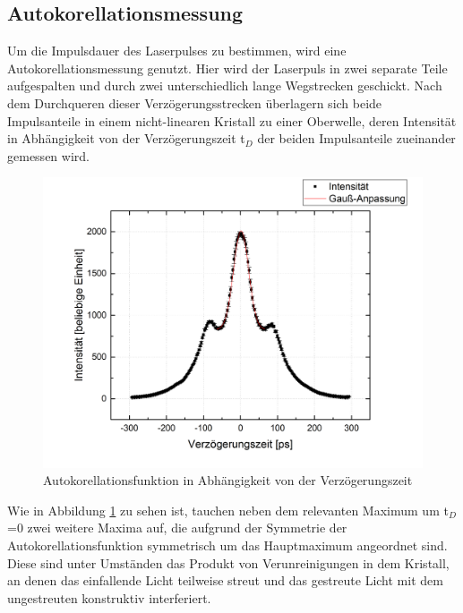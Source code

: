 \subsection{Autokorellationsmessung}
Um die Impulsdauer des Laserpulses zu bestimmen, wird eine Autokorellationsmessung genutzt. Hier wird der Laserpuls in zwei separate Teile aufgespalten und durch zwei unterschiedlich lange Wegstrecken geschickt. Nach dem Durchqueren dieser Verzögerungsstrecken überlagern sich beide Impulsanteile in einem nicht-linearen Kristall zu einer Oberwelle, deren Intensität in Abhängigkeit von der Verzögerungszeit t$_D$ der beiden Impulsanteile zueinander gemessen wird. 
\begin{figure}[H]
	\begin{center}
		\includegraphics[scale=.5]{Bilder/Autokorr1.png}
		\caption{Autokorellationsfunktion in Abhängigkeit von der Verzögerungszeit}
		\label{aut1}
	\end{center}
\end{figure}
Wie in Abbildung \ref{aut1} zu sehen ist, tauchen neben dem relevanten Maximum um t$_D$=0 zwei weitere Maxima auf, die aufgrund der Symmetrie der Autokorellationsfunktion symmetrisch um das Hauptmaximum angeordnet sind. Diese sind unter Umständen das Produkt von Verunreinigungen in dem Kristall, an denen das einfallende Licht teilweise streut und das gestreute Licht mit dem ungestreuten konstruktiv interferiert. 
